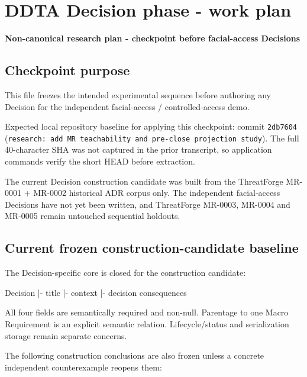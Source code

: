 \documentclass[
  10pt,
]{article}
\author{}
\date{}
\newenvironment{Shaded}{}{}
\newcommand{\NormalTok}[1]{#1}
\begin{document}
\section{DDTA Decision phase - work
plan}\label{ddta-decision-phase---work-plan}

\textbf{Non-canonical research plan - checkpoint before facial-access
Decisions}

\subsection{Checkpoint purpose}\label{checkpoint-purpose}

This file freezes the intended experimental sequence before authoring
any Decision for the independent facial-access / controlled-access demo.

Expected local repository baseline for applying this checkpoint: commit
\texttt{2db7604}
(\texttt{research:\ add\ MR\ teachability\ and\ pre-close\ projection\ study}).
The full 40-character SHA was not captured in the prior transcript, so
application commands verify the short HEAD before extraction.

The current Decision construction candidate was built from the
ThreatForge MR-0001 + MR-0002 historical ADR corpus only. The
independent facial-access Decisions have not yet been written, and
ThreatForge MR-0003, MR-0004 and MR-0005 remain untouched sequential
holdouts.

\subsection{Current frozen construction-candidate
baseline}\label{current-frozen-construction-candidate-baseline}

The Decision-specific core is closed for the construction candidate:

\begin{Shaded}
\begin{Highlighting}[]
\NormalTok{Decision}
\NormalTok{|{-} title}
\NormalTok{|{-} context}
\NormalTok{|{-} decision}
\NormalTok{\textasciigrave{}{-} consequences}
\end{Highlighting}
\end{Shaded}

All four fields are semantically required and non-null. Parentage to one
Macro Requirement is an explicit semantic relation. Lifecycle/status and
serialization storage remain separate concerns.

The following construction conclusions are also frozen unless a concrete
independent counterexample reopens them:
\end{document}
